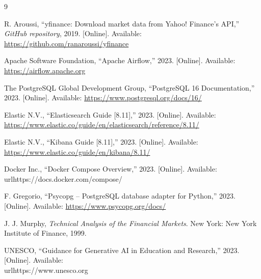 \documentclass[conference]{IEEEtran}
\begin{document}
\begin{thebibliography}{9}

R. Aroussi, ``yfinance: Download market data from Yahoo! Finance's API,''
\textit{GitHub repository}, 2019. [Online].
Available: \url{https://github.com/ranaroussi/yfinance}

Apache Software Foundation, ``Apache Airflow,'' 2023. [Online].
Available: \url{https://airflow.apache.org}

The PostgreSQL Global Development Group, ``PostgreSQL 16 Documentation,''
2023. [Online]. Available: \url{https://www.postgresql.org/docs/16/}

Elastic N.V., ``Elasticsearch Guide [8.11],'' 2023. [Online].
Available: \url{https://www.elastic.co/guide/en/elasticsearch/reference/8.11/}

Elastic N.V., ``Kibana Guide [8.11],'' 2023. [Online].
Available: \url{https://www.elastic.co/guide/en/kibana/8.11/}

Docker Inc., ``Docker Compose Overview,'' 2023. [Online].
Available: \\url{https://docs.docker.com/compose/}

F. Gregorio, ``Psycopg -- PostgreSQL database adapter for Python,''
2023. [Online]. Available: \url{https://www.psycopg.org/docs/}

J. J. Murphy, \textit{Technical Analysis of the Financial Markets}.
New York: New York Institute of Finance, 1999.

UNESCO, ``Guidance for Generative AI in Education and Research,''
2023. [Online]. Available: \\url{https://www.unesco.org}

\end{thebibliography}
\end{document}

